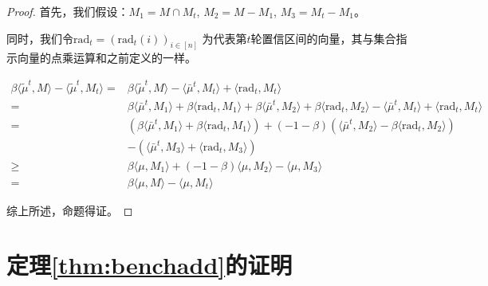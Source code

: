 \documentclass[bachelor]{thuthesis}
\begin{document}
\begin{proof}

首先，我们假设：$M_1=M\cap M_t$, $M_2=M-M_1$, $M_3=M_t-M_1$。

同时，我们令$\text{rad}_t=(\text{rad}_t(i))_{i\in[n]}$ 为代表第$t$轮置信区间的向量，其与集合指示向量的点乘运算和之前定义的一样。

\begin{equation}
\begin{split}
\beta\langle\tilde{\mu}^t,M\rangle - \langle\tilde{\mu}^t,M_t\rangle = & \beta\langle\tilde{\mu}^t,M \rangle - \langle\bar{\mu}^t,M_t\rangle + \langle\text{rad}_t,M_t\rangle\\
          = & \beta\langle\bar{\mu}^t,M_1\rangle+\beta\langle\text{rad}_t,M_1\rangle +\beta\langle\bar{\mu}^t,M_2\rangle+\beta\langle\text{rad}_t,M_2\rangle
          - \langle\bar{\mu}^t,M_t\rangle + \langle\text{rad}_t,M_t\rangle\\
          = & \left(\beta\langle\bar{\mu}^t,M_1\rangle+\beta\langle\text{rad}_t,M_1\rangle \right) + (-1-\beta)\left(\langle\bar{\mu}^t,M_2\rangle-\beta\langle\text{rad}_t,M_2\rangle \right)\\
          & - \left(\langle\bar{\mu}^t,M_3\rangle + \langle\text{rad}_t,M_3\rangle\right)\\
          \ge & \beta\langle\mu,M_1\rangle + (-1-\beta)\langle\mu,M_2\rangle
          - \langle\mu,M_3\rangle\\
          = & \beta\langle\mu,M\rangle-\langle\mu,M_t\rangle
\end{split}
\end{equation}

综上所述，命题得证。

\end{proof}

\section{定理\ref{thm:benchadd}的证明}
\end{document}
